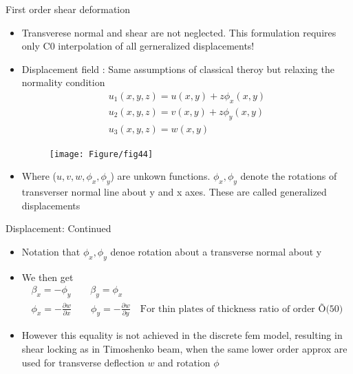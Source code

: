 	
	\begin{frame}{First order shear deformation}
		\begin{itemize}
			\item Transverese normal and shear are not neglected. This formulation requires only C0 interpolation of all gerneralized displacements!
			\item Displacement field : Same assumptions of classical theroy but relaxing the normality condition
			\begin{equation}
			\begin{aligned}
				u_1(x,y,z) = u(x,y) + z\phi_x(x,y)\\
				u_2(x,y,z) = v(x,y) + z\phi_y(x,y)\\
				u_3(x,y,z) = w(x,y) 
			\end{aligned}
			\end{equation}
			\begin{figure}
				\centering
				\texttt{[image: Figure/fig44]}  		
			\end{figure}
			\item Where ($u,v,w,\phi_x,\phi_y$) are unkown functions. $\phi_x,\phi_y$ denote the rotations of transverser normal line about y and x axes. These are called generalized displacements
		\end{itemize}
	\end{frame}


	\begin{frame}{Displacement: Continued}
		\begin{itemize}
			\item Notation that $\phi_x,\phi_y$ denoe rotation about a transverse normal about y
			\item We then get
			\begin{equation}
			\begin{aligned}
				\beta_x = -\phi_y \qquad \beta_y = \phi_x\\
				\phi_x = - \frac{\partial w}{\partial x} \qquad 				
				\phi_y = - \frac{\partial w}{\partial y} \quad \text{For thin plates of thickness ratio of order \~ O(50)}
			\end{aligned}
			\end{equation}
			\item However this equality is not achieved in the discrete fem model, resulting in shear locking as in Timoshenko beam, when the same lower order approx are used for transverse deflection $w$ and rotation $\phi$
			
		\end{itemize}
	\end{frame}


